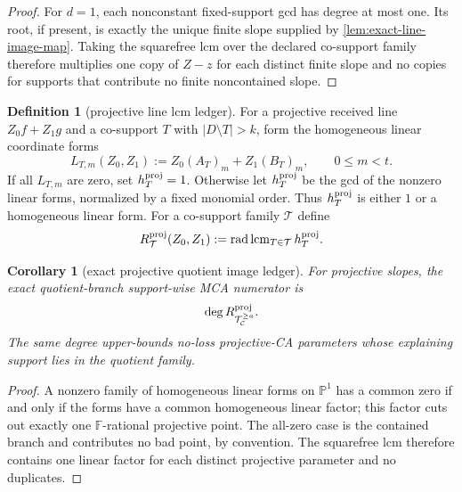 \documentclass[11pt]{article}
\newtheorem{corollary}[theorem]{Corollary}
\theoremstyle{definition}
\newtheorem{definition}[theorem]{Definition}
\theoremstyle{remark}
\newcommand{\F}{\mathbb{F}}
\begin{document}
\begin{proof}
For $d=1$, each nonconstant fixed-support gcd has degree at most one.  Its root,
if present, is exactly the unique finite slope supplied by
\cref{lem:exact-line-image-map}.  Taking the squarefree lcm over the declared
co-support family therefore multiplies one copy of $Z-z$ for each distinct
finite slope and no copies for supports that contribute no finite noncontained
slope.
\end{proof}

\begin{definition}[projective line lcm ledger]
\label{def:projective-line-lcm-ledger}
For a projective received line $Z_0f+Z_1g$ and a co-support $T$ with
$|D\setminus T|>k$, form the homogeneous linear coordinate forms
\[
        L_{T,m}(Z_0,Z_1):=Z_0(A_T)_m+Z_1(B_T)_m,
        \qquad 0\le m<t .
\]
If all $L_{T,m}$ are zero, set $h_T^{\rm proj}=1$.  Otherwise let
$h_T^{\rm proj}$ be the gcd of the nonzero linear forms, normalized by a fixed
monomial order.  Thus $h_T^{\rm proj}$ is either $1$ or a homogeneous linear
form.  For a co-support family $\mathcal T$ define
\[
        R_{\mathcal T}^{\rm proj}(Z_0,Z_1)
        :=\operatorname{rad}\operatorname{lcm}_{T\in\mathcal T}h_T^{\rm proj}.
\]
\end{definition}

\begin{corollary}[exact projective quotient image ledger]
\label{cor:projective-line-lcm-ledger}
For projective slopes, the exact quotient-branch support-wise MCA numerator is
\[
        \deg R_{\mathcal T_{\mathcal C}^{\ge a}}^{\rm proj}.
\]
The same degree upper-bounds no-loss projective-CA parameters whose explaining
support lies in the quotient family.
\end{corollary}

\begin{proof}
A nonzero family of homogeneous linear forms on $\mathbb P^1$ has a common zero
if and only if the forms have a common homogeneous linear factor; this factor
cuts out exactly one $\F$-rational projective point.  The all-zero case is the
contained branch and contributes no bad point, by convention.  The squarefree
lcm therefore contains one linear factor for each distinct projective parameter
and no duplicates.
\end{proof}
\end{document}
